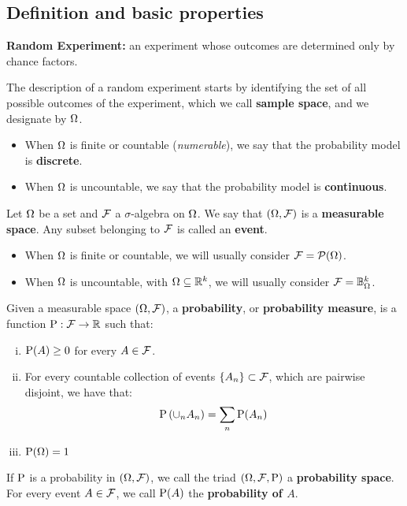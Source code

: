 
\subsection{Definition and basic properties}

\begin{definition}
	\textbf{Random Experiment:} an experiment whose outcomes are determined only by chance factors.
\end{definition}

\begin{definition}
	The description of a random experiment starts by identifying the set of all possible  outcomes of the experiment, which we call \textbf{sample space}, and we designate by $\O$.
	\begin{itemize}
		\item When $\O$ is finite or countable (\textit{numerable}), we say that the probability model is \textbf{discrete}.
		\item When $\O$ is uncountable, we say that the probability model is \textbf{continuous}.
	\end{itemize}
\end{definition}

\begin{definition}
	Let $\O$ be a set and $\F$ a $\sigma$-algebra on $\O$. We say that $(\O, \F)$ is a \textbf{measurable space}. Any subset belonging to $\F$ is called an \textbf{event}.
	\begin{itemize}
		\item When $\O$ is finite or countable, we will usually consider $\F = \mathcal{P}(\O)$.
		\item When $\O$ is uncountable, with $\O \subseteq \R^k$, we will usually consider $\F = \mathbb{B}_{\O}^k$.
	\end{itemize}
\end{definition}

\begin{definition}
	Given a measurable space $(\O, \F)$, a \textbf{probability}, or \textbf{probability measure}, is a function $\P: \F \rightarrow \R$ such that:
	\begin{enumerate}[i)]
		\item $\P(A) \geq 0$ for every $A \in \F$.
		\item For every countable collection of events $\{A_n\} \subset \F$, which are pairwise disjoint, we have that:
		\[
			\P \left(\cup_n A_n\right) = \sum_n \P(A_n)
		\]
		\item $\P(\O) = 1$
	\end{enumerate}
	If $\P$ is a probability in $(\O, \F)$, we call the triad $(\O, \F, \P)$ a \textbf{probability space}. For every event $A \in \F$, we call $\P(A)$ the \textbf{probability of $A$}.
\end{definition}

